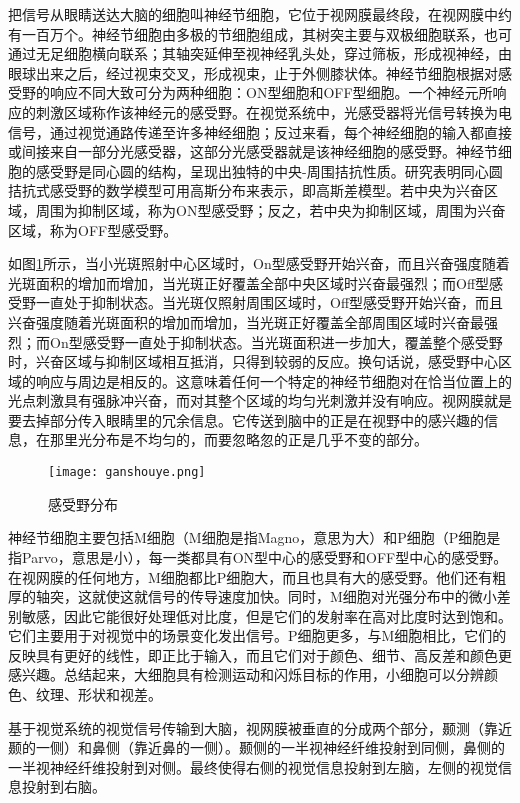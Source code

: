 \documentclass[a4paper,12pt]{article}
\begin{document}
把信号从眼睛送达大脑的细胞叫神经节细胞\cite{15:book}，它位于视网膜最终段，在视网膜中约有一百万个。神经节细胞由多极的节细胞组成，其树突主要与双极细胞联系，也可通过无足细胞横向联系；其轴突延伸至视神经乳头处，穿过筛板，形成视神经，由眼球出来之后，经过视束交叉，形成视束，止于外侧膝状体。神经节细胞根据对感受野的响应不同大致可分为两种细胞：ON型细胞和OFF型细胞\cite{5:article}。一个神经元所响应的刺激区域称作该神经元的感受野。在视觉系统中，光感受器将光信号转换为电信号，通过视觉通路传递至许多神经细胞；反过来看，每个神经细胞的输入都直接或间接来自一部分光感受器，这部分光感受器就是该神经细胞的感受野。神经节细胞的感受野是同心圆的结构\cite{17:book}，呈现出独特的中央-周围拮抗性质。研究表明同心圆拮抗式感受野的数学模型可用高斯分布来表示，即高斯差模型。若中央为兴奋区域，周围为抑制区域，称为ON型感受野；反之，若中央为抑制区域，周围为兴奋区域，称为OFF型感受野。


如图\ref{fig 6}所示，当小光斑照射中心区域时，On型感受野开始兴奋，而且兴奋强度随着光斑面积的增加而增加，当光斑正好覆盖全部中央区域时兴奋最强烈；而Off型感受野一直处于抑制状态。当光斑仅照射周围区域时，Off型感受野开始兴奋，而且兴奋强度随着光斑面积的增加而增加，当光斑正好覆盖全部周围区域时兴奋最强烈；而On型感受野一直处于抑制状态。当光斑面积进一步加大，覆盖整个感受野时，兴奋区域与抑制区域相互抵消，只得到较弱的反应。换句话说，感受野中心区域的响应与周边是相反的\cite{16:book}。这意味着任何一个特定的神经节细胞对在恰当位置上的光点刺激具有强脉冲兴奋，而对其整个区域的均匀光刺激并没有响应。视网膜就是要去掉部分传入眼睛里的冗余信息。它传送到脑中的正是在视野中的感兴趣的信息，在那里光分布是不均匀的，而要忽略忽的正是几乎不变的部分。

\begin{figure}[!htb]
\centering
\texttt{[image: ganshouye.png]}
\caption{感受野分布}\label{fig 6} 
\end{figure}


神经节细胞主要包括M细胞（M细胞是指Magno，意思为大）和P细胞（P细胞是指Parvo，意思是小）\cite{16:book}，每一类都具有ON型中心的感受野和OFF型中心的感受野。在视网膜的任何地方，M细胞都比P细胞大，而且也具有大的感受野。他们还有粗厚的轴突，这就使这就信号的传导速度加快。同时，M细胞对光强分布中的微小差别敏感，因此它能很好处理低对比度，但是它们的发射率在高对比度时达到饱和。它们主要用于对视觉中的场景变化发出信号。P细胞更多，与M细胞相比，它们的反映具有更好的线性，即正比于输入，而且它们对于颜色、细节、高反差和颜色更感兴趣。总结起来，大细胞具有检测运动和闪烁目标的作用，小细胞可以分辨颜色、纹理、形状和视差。


基于视觉系统的视觉信号传输到大脑，视网膜被垂直的分成两个部分，颞测（靠近颞的一侧）和鼻侧（靠近鼻的一侧）。颞侧的一半视神经纤维投射到同侧，鼻侧的一半视神经纤维投射到对侧。最终使得右侧的视觉信息投射到左脑，左侧的视觉信息投射到右脑。
\end{document}

